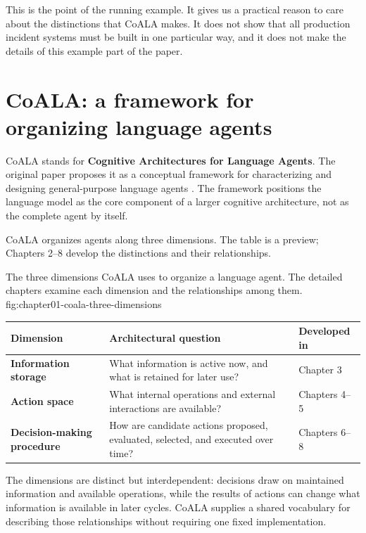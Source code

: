 This is the point of the running example. It gives us a practical reason to care about the distinctions that CoALA makes. It does not show that all production incident systems must be built in one particular way, and it does not make the details of this example part of the paper.

\section{CoALA: a framework for organizing language agents}\label{coala-a-framework-for-organizing-language-agents}

CoALA stands for \textbf{Cognitive Architectures for Language Agents}. The original paper proposes it as a conceptual framework for characterizing and designing general-purpose language agents . The framework positions the language model as the core component of a larger cognitive architecture, not as the complete agent by itself.

CoALA organizes agents along three dimensions. The table is a preview; Chapters 2--8 develop the distinctions and their relationships.

  {The three dimensions CoALA uses to organize a language agent. The detailed chapters examine each dimension and the relationships among them.}
  {fig:chapter01-coala-three-dimensions}

\begin{center}
\begin{tabularx}{\textwidth}{>{\bfseries}p{} X p{}}
\toprule
Dimension & Architectural question & Developed in \\
\midrule
Information storage & What information is active now, and what is retained for later use? & Chapter 3 \\
Action space & What internal operations and external interactions are available? & Chapters 4--5 \\
Decision-making procedure & How are candidate actions proposed, evaluated, selected, and executed over time? & Chapters 6--8 \\
\bottomrule
\end{tabularx}
\end{center}

The dimensions are distinct but interdependent: decisions draw on maintained information and available operations, while the results of actions can change what information is available in later cycles. CoALA supplies a shared vocabulary for describing those relationships without requiring one fixed implementation.

